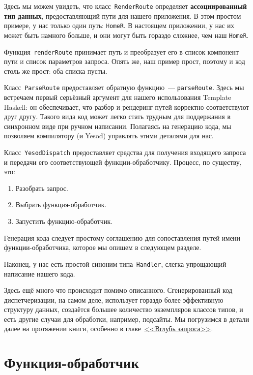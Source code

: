 Здесь мы можем увидеть, что класс~\lstinline'RenderRoute' определяет
\textbf{ассоциированный тип данных}, предоставляющий пути для нашего
приложения. В этом простом примере, у нас только один путь: \lstinline{HomeR}.
В настоящем приложении, у нас их может быть намного больше, и они могут быть
гораздо сложнее, чем наш \lstinline{HomeR}.

Функция~\lstinline{renderRoute} принимает путь и преобразует его в список
компонент пути и список параметров запроса. Опять же, наш пример прост, поэтому и
код столь же прост: оба списка пусты.

Класс~\lstinline{ParseRoute} предоставляет обратную функцию~---
\lstinline{parseRoute}. Здесь мы встречаем первый серьёзный аргумент для нашего
использования Template Haskell: он обеспечивает, что разбор и рендеринг путей
корректно соответствуют друг другу. Такого вида код может легко стать трудным
для поддержания в синхронном виде при ручном написании. Полагаясь на генерацию
кода, мы позволяем компилятору (и Yesod) управлять этими деталями для нас.

Класс~\lstinline{YesodDispatch} предоставляет средства для получения входящего
запроса и передачи его соответствующей функции-обработчику. Процесс, по
существу, это:
\begin{enumerate}
    \item Разобрать запрос.
    \item Выбрать функция-обработчик.
    \item Запустить функцию-обработчик.
\end{enumerate}

Генерация кода следует простому соглашению для сопоставления путей имени
функции-обработчика, которое мы опишем в следующем разделе.

Наконец, у нас есть простой синоним типа~\lstinline{Handler}, слегка
упрощающий написание нашего кода.

Здесь ещё много что происходит помимо описанного. Сгенерированный код
диспетчеризации, на самом деле, использует гораздо более эффективную структуру
данных, создаётся большее количество экземпляров классов типов, и есть другие
случаи для обработки, например, подсайты. Мы погрузимся в детали далее на
протяжении книги, особенно в главе~\hyperref[chap:request]{<<Вглубь запроса>>}.

\section{Функция-обработчик}

